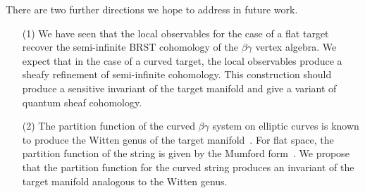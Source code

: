 There are two further directions we hope to address in future work.
\begin{itemize}
\item[(1)] We have seen that the local observables for the case of a flat target recover the semi-infinite BRST cohomology of the $\beta\gamma$ vertex algebra. 
We expect that in the case of a curved target, the local observables produce a sheafy refinement of semi-infinite cohomology. 
This construction should produce a sensitive invariant of the target manifold and give a variant of quantum sheaf cohomology. 
\item[(2)] The partition function of the curved $\beta\gamma$ system on elliptic curves is known to produce the Witten genus of the target manifold~\cite{wg2}. 
For flat space, the partition function of the string is given by the Mumford form~\cite{BM}. 
We propose that the partition function for the curved string produces an invariant of the target manifold analogous to the Witten genus. 
\end{itemize}
